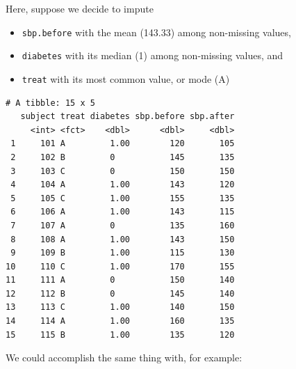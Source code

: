 \documentclass[]{book}
\newenvironment{Shaded}{\begin{snugshade}}{\end{snugshade}}
\newcommand{\KeywordTok}[1]{\textcolor[rgb]{0.13,0.29,0.53}{\textbf{#1}}}
\newcommand{\DataTypeTok}[1]{\textcolor[rgb]{0.13,0.29,0.53}{#1}}
\newcommand{\DecValTok}[1]{\textcolor[rgb]{0.00,0.00,0.81}{#1}}
\newcommand{\FloatTok}[1]{\textcolor[rgb]{0.00,0.00,0.81}{#1}}
\newcommand{\StringTok}[1]{\textcolor[rgb]{0.31,0.60,0.02}{#1}}
\newcommand{\OtherTok}[1]{\textcolor[rgb]{0.56,0.35,0.01}{#1}}
\newcommand{\OperatorTok}[1]{\textcolor[rgb]{0.81,0.36,0.00}{\textbf{#1}}}
\newcommand{\NormalTok}[1]{#1}
\providecommand{\tightlist}{%
  \setlength{\itemsep}{0pt}\setlength{\parskip}{0pt}}
\theoremstyle{definition}
\theoremstyle{definition}
\theoremstyle{definition}
\theoremstyle{remark}
\begin{document}
Here, suppose we decide to impute

\begin{itemize}
\tightlist
\item
  \texttt{sbp.before} with the mean (143.33) among non-missing values,
\item
  \texttt{diabetes} with its median (1) among non-missing values, and
\item
  \texttt{treat} with its most common value, or mode (A)
\end{itemize}

\begin{Shaded}
\end{Shaded}

\begin{verbatim}
# A tibble: 15 x 5
   subject treat diabetes sbp.before sbp.after
     <int> <fct>    <dbl>      <dbl>     <dbl>
 1     101 A         1.00        120       105
 2     102 B         0           145       135
 3     103 C         0           150       150
 4     104 A         1.00        143       120
 5     105 C         1.00        155       135
 6     106 A         1.00        143       115
 7     107 A         0           135       160
 8     108 A         1.00        143       150
 9     109 B         1.00        115       130
10     110 C         1.00        170       155
11     111 A         0           150       140
12     112 B         0           145       140
13     113 C         1.00        140       150
14     114 A         1.00        160       135
15     115 B         1.00        135       120
\end{verbatim}

We could accomplish the same thing with, for example:

\begin{Shaded}
\end{Shaded}
\end{document}
